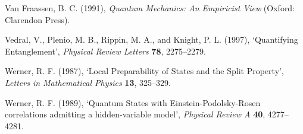 \documentclass[12pt]{article}
\begin{document}
\noindent Van Fraassen, B. C. (1991), \emph{Quantum Mechanics: An 
Empiricist View} (Oxford: Clarendon Press).\vspace{.1in}

\noindent Vedral, V., Plenio, M. B., Rippin, M. A., and Knight, P. L. 
(1997), 
`Quantifying Entanglement', \emph{Physical Review Letters} \textbf{78}, 
2275--2279.\vspace{.1in}

\noindent Werner, R. F. (1987), `Local Preparability of States and the 
Split Property', \emph{Letters in Mathematical Physics} \textbf{13}, 325--329.\vspace{.1in}

\noindent Werner, R. F. (1989), `Quantum States with
  Einstein-Podolsky-Rosen correlations admitting a hidden-variable
  model', \emph{Physical Review A} \textbf{40}, 4277--4281.\vspace{.1in}
\end{document}
